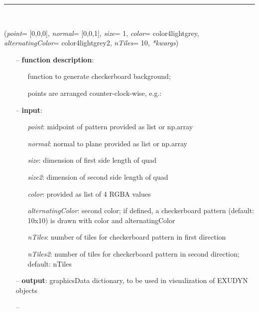 \begin{itemize}[leftmargin=1.4cm]
\begin{itemize}[leftmargin=1.4cm]
\begin{itemize}[leftmargin=1.4cm]
\begin{itemize}[leftmargin=0.5cm]
\begin{itemize}[leftmargin=1.4cm]
\begin{itemize}[leftmargin=1.4cm]
\begin{itemize}[leftmargin=0.5cm]
\begin{itemize}[leftmargin=1.4cm]
\begin{itemize}[leftmargin=0.5cm]
%
\noindent\rule{8cm}{0.75pt}\vspace{1pt} \\ 
\begin{flushleft}
\label{sec:graphicsDataUtilities:GraphicsDataCheckerBoard}
({\it point}= [0,0,0], {\it normal}= [0,0,1], {\it size}= 1, {\it color}= color4lightgrey, {\it alternatingColor}= color4lightgrey2, {\it nTiles}= 10, {\it **kwargs})
\end{flushleft}
\setlength{\itemindent}{0.7cm}
\begin{itemize}[leftmargin=0.7cm]
\item[--]
{\bf function description}: \vspace{-6pt}
\begin{itemize}[leftmargin=1.2cm]
\setlength{\itemindent}{-0.7cm}
\item[]function to generate checkerboard background;
\item[]points are arranged counter-clock-wise, e.g.:
\end{itemize}
\item[--]
{\bf input}: \vspace{-6pt}
\begin{itemize}[leftmargin=1.2cm]
\setlength{\itemindent}{-0.7cm}
\item[]{\it point}: midpoint of pattern provided as list or np.array
\item[]{\it normal}: normal to plane provided as list or np.array
\item[]{\it size}: dimension of first side length of quad
\item[]{\it size2}: dimension of second side length of quad
\item[]{\it color}: provided as list of 4 RGBA values
\item[]{\it alternatingColor}: second color; if defined, a checkerboard pattern (default: 10x10) is drawn with color and alternatingColor
\item[]{\it nTiles}: number of tiles for checkerboard pattern in first direction
\item[]{\it nTiles2}: number of tiles for checkerboard pattern in second direction; default: nTiles
\end{itemize}
\item[--]
{\bf output}: graphicsData dictionary, to be used in visualization of EXUDYN objects
\item[--]

\end{itemize}
\end{itemize}
\end{itemize}
\end{itemize}
\end{itemize}
\end{itemize}
\end{itemize}
\end{itemize}
\end{itemize}
\end{itemize}
